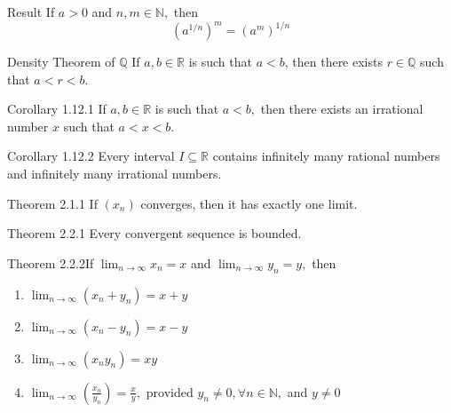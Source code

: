\documentclass[10pt,landscape]{article}
\makeatletter
\renewcommand{\section}{\@startsection{section}{1}{0mm}%
                                {-1ex plus -.5ex minus -.2ex}%
                                {0.5ex plus .2ex}%
                                {\normalfont\large\bfseries}}
\theoremstyle{definition}
\newcommand{\thistheoremname}{}
\newtheorem*{genericthm*}{\thistheoremname}
\newenvironment{namedthm*}[1]
{\renewcommand{\thistheoremname}{#1}\begin{genericthm*}}
{\end{genericthm*}}
\makeatother
\begin{document}
\begin{multicols}{3}
	\begin{namedthm*}{Result}
		If \(a>0\) and \(n, m \in \mathbb{N},\) then
		$$
			\left(a^{1 / n}\right)^{m}=\left(a^{m}\right)^{1 / n}
		$$
	\end{namedthm*}

	\begin{namedthm*}{Density Theorem of \(\mathbb{Q}\)}
		If \(a, b \in \mathbb{R}\) is such that \(a<b\), then there exists \(r \in \mathbb{Q}\) such that
		\(a<r<b .\)
	\end{namedthm*}

	\begin{namedthm*}{Corollary 1.12.1}
		If \(a, b \in \mathbb{R}\) is such that \(a<b,\) then there exists an irrational number \(x\)
		such that \(a<x<b .\)
	\end{namedthm*}

	\begin{namedthm*}{Corollary 1.12.2}
		Every interval \(I \subseteq \mathbb{R}\) contains infinitely many rational numbers and infinitely many irrational numbers.
	\end{namedthm*}


	\begin{namedthm*}{Theorem 2.1.1}
		If \(\left(x_{n}\right)\) converges, then it has exactly one limit.
	\end{namedthm*}

	\begin{namedthm*}{Theorem 2.2.1}
		Every convergent sequence is bounded.
	\end{namedthm*}

	\begin{namedthm*}{Theorem 2.2.2}If \(\lim _{n \rightarrow \infty} x_{n}=x\) and \(\lim _{n \rightarrow \infty} y_{n}=y,\) then
		~
		\begin{enumerate}
			\item \(\lim _{n \rightarrow \infty}\left(x_{n}+y_{n}\right)=x+y\)
			\item \(\lim _{n \rightarrow \infty}\left(x_{n}-y_{n}\right)=x-y\)
			\item \(\lim _{n \rightarrow \infty}\left(x_{n} y_{n}\right)=x y\)
			\item \(\lim _{n \rightarrow \infty}\left(\frac{x_{n}}{y_{n}}\right)=\frac{x}{y},\) provided \(y_{n} \neq 0, \forall n \in \mathbb{N},\) and \(y \neq 0\)
		\end{enumerate}
	\end{namedthm*}


\end{multicols}
\end{document}
